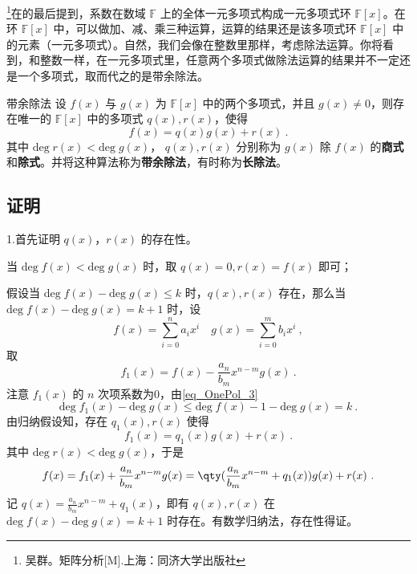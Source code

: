 
\begin{issues}
\end{issues}

\footnote{吴群。矩阵分析[M].上海：同济大学出版社}在的最后提到，系数在数域 $\mathbb{F}$ 上的全体一元多项式构成一元多项式环 $\mathbb{F}[x]$。在环 $\mathbb{F}[x]$ 中，可以做加、减、乘三种运算，运算的结果还是该多项式环 $\mathbb{F}[x]$ 中的元素（一元多项式）。自然，我们会像在整数里那样，考虑除法运算。你将看到，和整数一样，在一元多项式里，任意两个多项式做除法运算的结果并不一定还是一个多项式，取而代之的是带余除法。
\begin{theorem}{带余除法}\label{the_DivAlg_1}
设 $f(x)$ 与 $g(x)$ 为 $\mathbb{F}[x]$ 中的两个多项式，并且 $g(x)\neq 0$，则存在唯一的 $\mathbb{F}[x]$ 中的多项式 $q(x),r(x)$，使得
\begin{equation}
f(x)=q(x)g(x)+r(x)~.
\end{equation}
其中 $\mathrm{deg}\;r(x)<\mathrm{deg}\;g(x)$， $q(x),r(x)$ 分别称为 $g(x)$ 除 $f(x)$ 的\textbf{商式}和\textbf{除式}。并将这种算法称为\textbf{带余除法}，有时称为\textbf{长除法}。
\end{theorem}
\subsection{证明}
1.首先证明 $q(x)$，$r(x)$ 的存在性。

当 $\mathrm{deg}\;f(x)<\mathrm{deg}\;g(x)$ 时，取 $q(x)=0,r(x)=f(x)$ 即可；

假设当 $\mathrm{deg}\;f(x)-\mathrm{deg}\;g(x)\leq k$ 时，$q(x),r(x)$ 存在，那么当 $\mathrm{deg}\;f(x)-\mathrm{deg}\;g(x)=k+1$ 时，设
\begin{equation}
f(x)=\sum_{i=0}^n a_i x^i\quad g(x)=\sum_{i=0}^m b_ix^i~,
\end{equation}
取
\begin{equation}
f_1(x)=f(x)-\frac{a_n}{b_m}x^{n-m}g(x)~.
\end{equation}
注意 $f_1(x)$ 的 $n$ 次项系数为0，由\autoref{eq_OnePol_3}~
\begin{equation}
\mathrm{deg}\;f_1(x)-\mathrm{deg}\;g(x)\leq\mathrm{deg}\; f(x)-1-\mathrm{deg}\;g(x)=k~.
\end{equation}
由归纳假设知，存在 $q_1(x),r(x)$ 使得
\begin{equation}
f_1(x)=q_1(x)g(x)+r(x)~.
\end{equation}
其中 $\mathrm{deg}\;r(x)<\mathrm{deg}\;g(x)$，于是
\begin{equation}
f(x)=f_1(x)+\frac{a_n}{b_m}x^{n-m}g(x)=\qty(\frac{a_n}{b_m}x^{n-m}+q_1(x))g(x)+r(x)~.
\end{equation}
记 $q(x)=\frac{a_n}{b_m}x^{n-m}+q_1(x)$，即有 $q(x),r(x)$ 在 $\mathrm{deg}\;f(x)-\mathrm{deg}\;g(x)=k+1$ 时存在。有数学归纳法，存在性得证。

